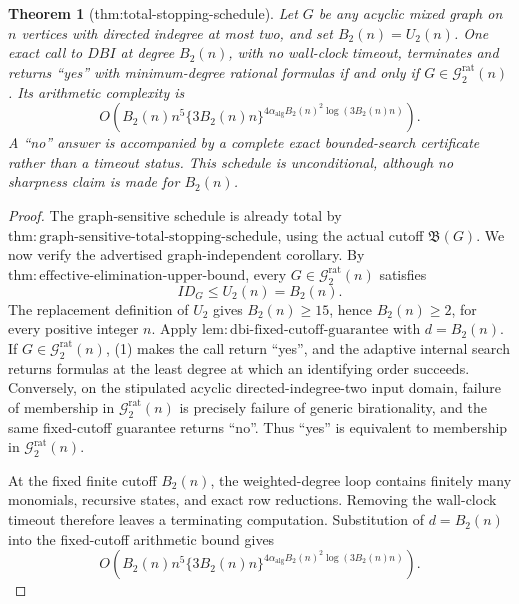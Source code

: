 \documentclass{article}
\newtheorem{theorem}{Theorem}
\begin{document}
\begin{theorem}[thm:total-stopping-schedule]\label{thm:total-stopping-schedule}
Let \(G\) be any acyclic mixed graph on \(n\) vertices with directed indegree at most two, and set \(B_2(n)=U_2(n)\).  One exact call to \(DBI\) at degree \(B_2(n)\), with no wall-clock timeout, terminates and returns ``yes'' with minimum-degree rational formulas if and only if \(G\in\mathcal G_{2}^{\mathrm{rat}}(n)\).  Its arithmetic complexity is
\[
 O\!\left(B_2(n)n^5\{3B_2(n)n\}^{4\alpha_{\mathrm{alg}}B_2(n)^2\log(3B_2(n)n)}\right).
\]
A ``no'' answer is accompanied by a complete exact bounded-search certificate rather than a timeout status.  This schedule is unconditional, although no sharpness claim is made for \(B_2(n)\).
\end{theorem}
\begin{proof}
The graph-sensitive schedule is already total by \(\mathrm{thm:graph\mbox{-}sensitive\mbox{-}total\mbox{-}stopping\mbox{-}schedule}\), using the actual cutoff \(\mathfrak B(G)\).  We now verify the advertised graph-independent corollary.  By \(\mathrm{thm:effective\mbox{-}elimination\mbox{-}upper\mbox{-}bound}\), every \(G\in\mathcal G_{2}^{\mathrm{rat}}(n)\) satisfies
\[
 ID_G\leq U_2(n)=B_2(n).
 \tag{1}
\]
The replacement definition of \(U_2\) gives \(B_2(n)\geq15\), hence \(B_2(n)\geq2\), for every positive integer \(n\).  Apply \(\mathrm{lem:dbi\mbox{-}fixed\mbox{-}cutoff\mbox{-}guarantee}\) with \(d=B_2(n)\).  If \(G\in\mathcal G_{2}^{\mathrm{rat}}(n)\), (1) makes the call return ``yes'', and the adaptive internal search returns formulas at the least degree at which an identifying order succeeds.  Conversely, on the stipulated acyclic directed-indegree-two input domain, failure of membership in \(\mathcal G_{2}^{\mathrm{rat}}(n)\) is precisely failure of generic birationality, and the same fixed-cutoff guarantee returns ``no''.  Thus ``yes'' is equivalent to membership in \(\mathcal G_{2}^{\mathrm{rat}}(n)\).

At the fixed finite cutoff \(B_2(n)\), the weighted-degree loop contains finitely many monomials, recursive states, and exact row reductions.  Removing the wall-clock timeout therefore leaves a terminating computation.  Substitution of \(d=B_2(n)\) into the fixed-cutoff arithmetic bound gives
\[
 O\!\left(B_2(n)n^5\{3B_2(n)n\}^{4\alpha_{\mathrm{alg}}B_2(n)^2\log(3B_2(n)n)}\right).
 \tag{2}
\]


\end{proof}
\end{document}
